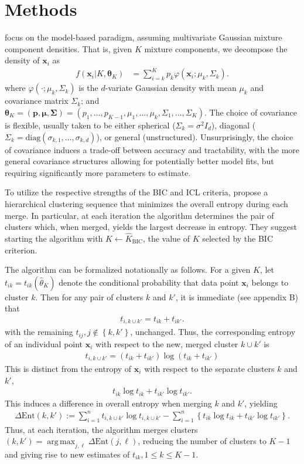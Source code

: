 \documentclass{uwstat572}
\newcommand*\ba{\[ \begin{aligned}}
\newcommand*\ea{\end{aligned} \]}
\newcommand*\set[1]{\left\{#1\right\}}
\newcommand*\estim[1]{\widehat{#1}}
\newcommand*\bp{\mathbf{p}}
\newcommand*\bx{\mathbf{x}}
\newcommand*\btheta{\boldsymbol{\theta}}
\newcommand*\bmu{\boldsymbol{\mu}}
\newcommand*\bSigma{\boldsymbol{\Sigma}}
\DeclareMathOperator*{\argmax}{arg\;max}
\renewcommand\;{\,}
\renewcommand\phi{\varphi}
\begin{document}
\section{Methods}

\cite{Baudry10} focus on the model-based paradigm, assuming multivariate Gaussian mixture component densities. 
That is, given $K$ mixture components, we decompose the density of $\bx_i$ as
\ba
f(\bx_i | K, \btheta_K)
	& = \sum_{i=k}^K p_k \phi (\bx_i ; \mu_k, \Sigma_k ).
\ea
where $\phi(\cdot; \mu_k, \Sigma_k)$ is the $d$-variate Gaussian density with mean $\mu_k$ and covariance matrix $\Sigma_k$; and $\btheta_K = (\bp, \bmu, \bSigma) = (p_1, \dotsc, p_{K - 1}, \mu_1, \dotsc, \mu_k, \Sigma_1, \dotsc, \Sigma_K)$.
The choice of covariance is flexible, usually taken to be either spherical ($\Sigma_k = \sigma^2 I_d$), diagonal ($\Sigma_k = \text{diag}(\sigma_{k,1}, \dotsc, \sigma_{k,d})$), or general (unstructured).
Unsurprisingly, the choice of covariance induces a trade-off between accuracy and tractability, with the more general covariance structures allowing for potentially better model fits, but requiring significantly more parameters to estimate.



To utilize the respective strengths of the BIC and ICL criteria, \cite{Baudry10}  propose a hierarchical clustering sequence that minimizes the overall entropy during each merge.
In particular, at each iteration the algorithm determines the pair of clusters which, when merged, yields the largest decrease in entropy.
They suggest starting the algorithm with $K \gets \estim K_\text{BIC}$, the value of $K$ selected by the BIC criterion.

The algorithm can be formalized notationally as follows.
For a given $K$, let $t_{ik} = t_{ik}(\estim\theta_K)$ denote the conditional probability that data point $\bx_i$ belongs to cluster $k$.
Then for any pair of clusters $k$ and $k'$, it is immediate (see appendix B) that
\ba
t_{i, k\cup k'} = t_{ik} + t_{ik'}.
\ea
with the remaining $t_{ij}, j \not\in \set{k, k'}$, unchanged.
Thus, the corresponding entropy of an individual point $\bx_i$ with respect to the new, merged cluster $k \cup k'$ is
\ba
t_{i, k\cup k'} = \left(t_{ik} + t_{ik'}\right) \log\left( t_{ik} + t_{ik'} \right)
\ea
This is distinct from the entropy of $\bx_i$ with respect to the separate clusters $k$ and $k'$,
\ba
t_{ik} \log t_{ik} + t_{ik'} \log t_{ik'}.
\ea
This induces a difference in overall entropy when merging $k$ and $k'$, yielding
\ba
\Delta\text{Ent}( k, k') :=
\sum_{i=1}^n t_{i,k\cup k'} \log t_{i, k \cup k'}
- \sum_{i=1}^n \left\{ t_{ik} \log t_{ik} + t_{ik'} \log t_{ik'} \right\}.
\ea
Thus, at each iteration, the algorithm merges clusters $(k, k') = \argmax_{j, \ell} \Delta\text{Ent}(j, \ell)$, reducing the number of clusters to $K - 1$ and giving rise to new estimates of $t_{ik}, 1 \le k \le K - 1$. 
\end{document}
